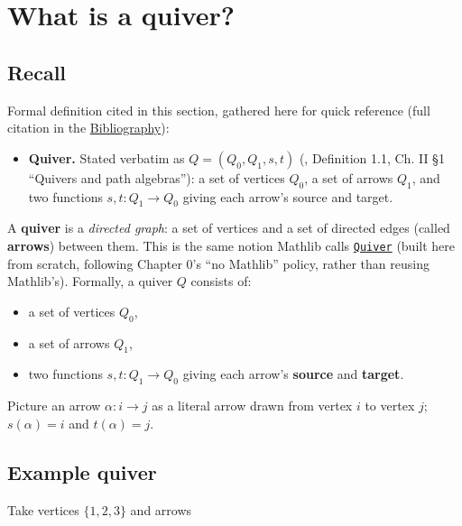 \section{What is a quiver?}\label{sec:11-path-algebras:01-what-is-a-quiver:1}

\subsection{Recall}\label{sec:11-path-algebras:01-what-is-a-quiver:2}

Formal definition cited in this section, gathered here for quick reference (full citation in the \hyperref[sec:root:bibliography:1]{Bibliography}):

\begin{itemize}
\tightlist
\item
  \textbf{Quiver.} Stated verbatim as \(Q = (Q_0, Q_1, s, t)\) (\cite{AssemSimsonSkowronski2006}, Definition 1.1, Ch. II §1 ``Quivers and path algebras''): a set of vertices \(Q_0\), a set of arrows \(Q_1\), and two functions \(s, t : Q_1 \to Q_0\) giving each arrow's source and target.
\end{itemize}

A \textbf{quiver} is a \emph{directed graph}: a set of vertices and a set of directed edges (called \textbf{arrows}) between them. This is the same notion Mathlib calls \href{https://loogle.lean-lang.org/?q=Quiver}{\texttt{Quiver}} (built here from scratch, following Chapter 0's ``no Mathlib'' policy, rather than reusing Mathlib's). Formally, a quiver \(Q\) consists of:

\begin{itemize}
\tightlist
\item
  a set of vertices \(Q_0\),
\item
  a set of arrows \(Q_1\),
\item
  two functions \(s, t : Q_1 \to Q_0\) giving each arrow's \textbf{source} and \textbf{target}.
\end{itemize}

Picture an arrow \(\alpha : i \to j\) as a literal arrow drawn from vertex \(i\) to vertex \(j\); \(s(\alpha) = i\) and \(t(\alpha) = j\).

\subsection{Example quiver}\label{sec:11-path-algebras:01-what-is-a-quiver:3}

Take vertices \(\{1, 2, 3\}\) and arrows

